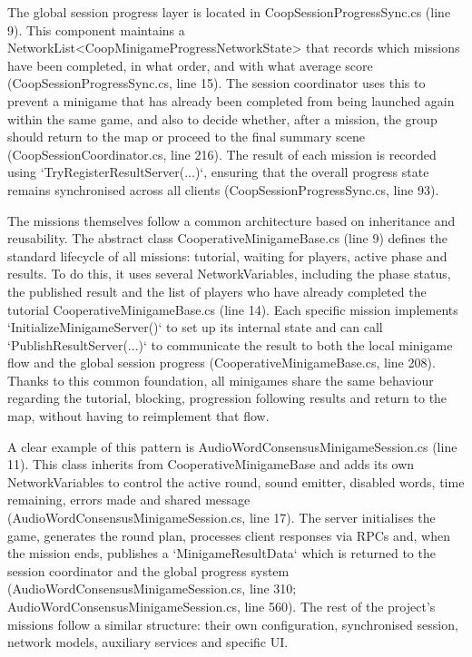 The global session progress layer is located in CoopSessionProgressSync.cs (line 9). This component maintains a NetworkList<CoopMinigameProgressNetworkState> that records which missions have been completed, in what order, and with what average score (CoopSessionProgressSync.cs, line 15). The session coordinator uses this to prevent a minigame that has already been completed from being launched again within the same game, and also to decide whether, after a mission, the group should return to the map or proceed to the final summary scene (CoopSessionCoordinator.cs, line 216). The result of each mission is recorded using `TryRegisterResultServer(...)`, ensuring that the overall progress state remains synchronised across all clients (CoopSessionProgressSync.cs, line 93).

The missions themselves follow a common architecture based on inheritance and reusability. The abstract class CooperativeMinigameBase.cs (line 9) defines the standard lifecycle of all missions: tutorial, waiting for players, active phase and results. To do this, it uses several NetworkVariables, including the phase status, the published result and the list of players who have already completed the tutorial CooperativeMinigameBase.cs (line 14). Each specific mission implements `InitializeMinigameServer()` to set up its internal state and can call `PublishResultServer(...)` to communicate the result to both the local minigame flow and the global session progress (CooperativeMinigameBase.cs, line 208). Thanks to this common foundation, all minigames share the same behaviour regarding the tutorial, blocking, progression following results and return to the map, without having to reimplement that flow.

A clear example of this pattern is AudioWordConsensusMinigameSession.cs (line 11). This class inherits from CooperativeMinigameBase and adds its own NetworkVariables to control the active round, sound emitter, disabled words, time remaining, errors made and shared message (AudioWordConsensusMinigameSession.cs, line 17). The server initialises the game, generates the round plan, processes client responses via RPCs and, when the mission ends, publishes a `MinigameResultData` which is returned to the session coordinator and the global progress system (AudioWordConsensusMinigameSession.cs, line 310; AudioWordConsensusMinigameSession.cs, line 560). The rest of the project’s missions follow a similar structure: their own configuration, synchronised session, network models, auxiliary services and specific UI.

